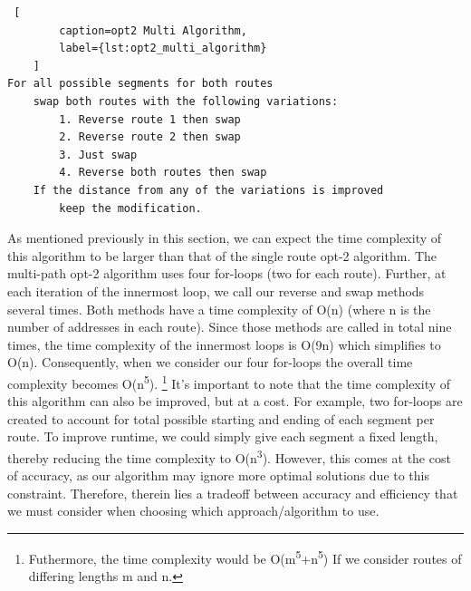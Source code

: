 \documentclass[letterpaper]{article}
\begin{document}
    \begin{lstlisting} [
        caption=opt2 Multi Algorithm,
        label={lst:opt2_multi_algorithm}
    ]
For all possible segments for both routes
    swap both routes with the following variations:
        1. Reverse route 1 then swap
        2. Reverse route 2 then swap
        3. Just swap
        4. Reverse both routes then swap
    If the distance from any of the variations is improved
        keep the modification.\end{lstlisting}
    
    
    As mentioned previously in this section, 
    we can expect the time complexity of this algorithm 
    to be larger than that of the single route opt-2 algorithm. 
    The multi-path opt-2 algorithm uses four for-loops 
    (two for each route). Further, at each iteration 
    of the innermost loop, we call our reverse and swap 
    methods several times. Both methods have a time
     complexity of O(n) (where n is the number of 
     addresses in each route). Since those methods 
     are called in total nine times, the time complexity 
     of the innermost loops is O(9n) which simplifies to O(n).
     Consequently, when we consider our four for-loops 
     the overall time complexity becomes O(n\textsuperscript5).
     \footnote{Futhermore, the time complexity would be 
     O(m\textsuperscript5+n\textsuperscript5) If we consider 
     routes of differing lengths m and n.} It’s important to 
     note that the time complexity of this algorithm 
     can also be improved, but at a cost. For example, 
     two for-loops are created to account for total 
     possible starting and ending of each segment per 
     route. To improve runtime, we could simply give 
     each segment a fixed length, thereby reducing 
     the time complexity to O(n\textsuperscript3). However, 
     this comes at the cost of accuracy, as our algorithm 
     may ignore more optimal solutions due to this constraint. 
     Therefore, therein lies a tradeoff between accuracy and 
     efficiency that we must consider when choosing which 
     approach/algorithm to use. 
\end{document}
